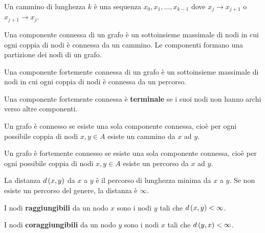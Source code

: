 \documentclass[\main/main.tex]{subfiles}
\begin{document}
\begin{multicols}{2}
\begin{definition}
    Un cammino di lunghezza \(k\) è una sequenza \(x_0, x_1, \ldots, x_{k-1}\) dove \(x_j \rightarrow x_{j+1}\) o \(x_{j+1} \rightarrow x_{j}\).
\end{definition}
\begin{definition}
    Una componente connessa di un grafo è un sottoinsieme massimale di nodi in cui ogni coppia di nodi è connessa da un cammino. Le componenti formano una partizione dei nodi di un grafo.
\end{definition}
\begin{definition}
    Una componente fortemente connessa di un grafo è un sottoinsieme massimale di nodi in cui ogni coppia di nodi è connessa da un percorso.
\end{definition}
\begin{definition}
    Una componente fortemente connessa è \textbf{terminale} se i suoi nodi non hanno archi verso altre componenti.
\end{definition}
\begin{definition}
    Un grafo è connesso se esiste una sola componente connessa, cioè per ogni possibile coppia di nodi \(x, y \in A\) esiste un cammino da \(x\) ad \(y\).
\end{definition}
\begin{definition}
    Un grafo è fortemente connesso se esiste una sola componente connessa, cioè per ogni possibile coppia di nodi \(x, y \in A\) esiste un percorso da \(x\) ad \(y\).
\end{definition}
\begin{definition}
    La distanza \(d\left(x,y\right)\) da \(x\) a \(y\) è il percorso di lunghezza minima da \(x\) a \(y\). Se non esiste un percorso del genere, la distanza è \(\infty\).
\end{definition}
\begin{definition}
    I nodi \textbf{raggiungibili} da un nodo \(x\) sono i nodi \(y\) tali che \(d\left(x,y\right) < \infty\).
\end{definition}
\begin{definition}
    I nodi \textbf{coraggiungibili} da un nodo \(y\) sono i nodi \(x\) tali che \(d\left(y,x\right) < \infty\).
\end{definition}
\begin{definition}

\end{definition}
\end{multicols}
\end{document}
